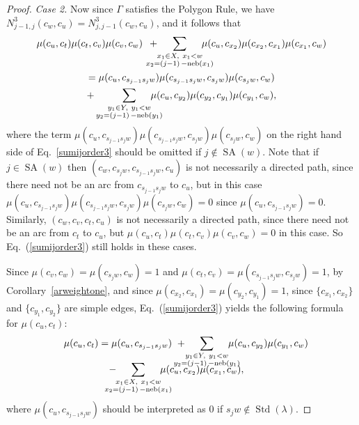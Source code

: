 \documentclass[ALCO,ThmDefs,Unicode,epreuves]{cedram}
\newenvironment{Case}[1]{\smallskip\noindent\emph{Case #1}\endgraf
 \nobreak\noindent\ignorespaces}{\endgraf\smallskip}
\DeclareMathOperator{\STD}{Std}
\DeclareMathOperator{\neb}{-neb}
\DeclareMathOperator{\SA}{SA}
\begin{document}
\begin{proof}
\begin{Case}{2.}
Now since $\Gamma$ satisfies the
Polygon Rule,
we have
$N^{3}_{j-1,j}(c_{w},c_{u})=N^{3}_{j,j-1}(c_{w},c_{u})$, and it follows that
\begin{multline}\label{sumijorder3}
\mu(c_{u},c_{t})\mu(c_{t},c_v)\mu(c_v,c_w)\,\,\, +\mskip -25mu\sum_{\substack{x_1\in X,\ x_1<w\\x_2=(j-1)\neb(x_1)}}\mskip -25mu
\mu(c_{u},c_{x_{2}})\mu(c_{x_{2}},c_{x_{1}})\mu(c_{x_{1}},c_w)\\
=\mu(c_{u},c_{s_{j-1}s_jw})\mu(c_{s_{j-1}s_jw},c_{s_jw})\mu(c_{s_jw},c_w)\\
+\sum_{\substack{y_1\in Y,\ y_1<w\\y_2=(j-1)\neb(y_1)}}\mskip -25mu
\mu(c_{u},c_{y_{2}})\mu(c_{y_{2}},c_{y_{1}})\mu(c_{y_{1}},c_{w}),
\end{multline}
where the term $\mu(c_{u},c_{s_{j-1}s_jw})\mu(c_{s_{j-1}s_jw},c_{s_jw})\mu(c_{s_jw},c_w)$
on the right hand side of Eq.~\eqref{sumijorder3} should be omitted if $j\notin\SA(w)$.
Note that if $j\in\SA(w)$ then $(c_w,c_{s_jw},c_{s_{j-1}s_jw},c_u)$ is not necessarily a
directed path, since there need not be an arc from $c_{s_{j-1}s_jw}$ to $c_u$, but
in this case $\mu(c_{u},c_{s_{j-1}s_jw})\mu(c_{s_{j-1}s_jw},c_{s_jw})\mu(c_{s_jw},c_w)=0$
since $\mu(c_u,c_{s_{j-1}s_jw})=0$. Similarly, $(c_w,c_v,c_t,c_u)$ is not necessarily a
directed path, since there need not be an arc from $c_t$ to $c_u$, but
$\mu(c_u,c_t)\mu(c_t,c_v)\mu(c_v,c_w)=0$ in this case.
So Eq.~(\ref{sumijorder3}) still holds in these cases.

Since $\mu(c_v,c_w) = \mu(c_{s_jw},c_w)= 1$ and
$\mu(c_{t},c_v)= \mu(c_{s_{j-1}s_jw},c_{s_jw}) = 1$, by Corollary~\ref{arweightone},
and since $\mu(c_{x_{2}},c_{x_{1}})=\mu(c_{y_{2}},c_{y_{1}})=1$, since
$\{c_{x_{1}},c_{x_{2}}\}$ and $\{c_{y_{1}},c_{y_{2}}\}$ are simple edges,
Eq.~(\ref{sumijorder3}) yields the following formula for $\mu(c_{u},c_{t})$:
\begin{multline*}
\quad\mu(c_{u},c_{t})=\mu(c_{u},c_{s_{j-1}s_{j}w})\,\,+\mskip -25mu
\sum_{\substack{y_1\in Y,\ y_1<w\\y_2=(j-1)\neb(y_1)}}\mskip -25mu
\mu(c_{u},c_{y_{2}})\mu(c_{y_{1}},c_{w})\\[-10pt]
-\mskip -25mu\sum_{\substack{x_1\in X,\ x_1<w\\x_2=(j-1)\neb(x_1)}}\mskip -25mu
\mu(c_{u},c_{x_{2}})\mu(c_{x_{1}},c_w),\quad
\end{multline*}
where $\mu(c_{u},c_{s_{j-1}s_{j}w})$ should be interpreted as $0$ if $s_jw\notin\STD(\lambda)$.


\end{Case}
\end{proof}
\end{document}
